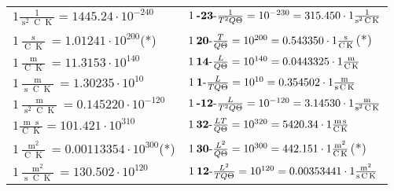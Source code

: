 \begin{center}
\begin{longtable}{l l}
{\color{black}$1 \bm{\mathrm{ }}\frac1{\operatorname{s}^2\operatorname{C}\operatorname{K}} = 1445.24\cdot10^{-240} $}&
	{\color{black}$1\:\text{\textbf{-23}-} \frac1{T^2Q\Theta}=10^{-230} = 315.450 \cdot 1 \bm{\mathrm{ }}\frac1{\operatorname{s}^2\operatorname{C}\operatorname{K}}$}\\
{\color{black}$1 \bm{\mathrm{ }}\frac{\operatorname{s}}{\operatorname{C}\operatorname{K}} = 1.01241\cdot10^{200} $}\quad(*)&
	{\color{black}$1\:\text{\textbf{20}-} \frac{T}{Q\Theta}=10^{200} = 0.543350 \cdot 1 \bm{\mathrm{ }}\frac{\operatorname{s}}{\operatorname{C}\operatorname{K}}$}\quad(*)\\
{\color{black}$1 \bm{\mathrm{ }}\frac{\operatorname{m}}{\operatorname{C}\operatorname{K}} = 11.3153\cdot10^{140} $}&
	{\color{black}$1\:\text{\textbf{14}-} \frac{L}{Q\Theta}=10^{140} = 0.0443325 \cdot 1 \bm{\mathrm{ }}\frac{\operatorname{m}}{\operatorname{C}\operatorname{K}}$}\\
{\color{black}$1 \bm{\mathrm{ }}\frac{\operatorname{m}}{\operatorname{s}\operatorname{C}\operatorname{K}} = 1.30235\cdot10^{10} $}&
	{\color{black}$1\:\text{\textbf{1}-} \frac{L}{TQ\Theta}=10^{10} = 0.354502 \cdot 1 \bm{\mathrm{ }}\frac{\operatorname{m}}{\operatorname{s}\operatorname{C}\operatorname{K}}$}\\
{\color{black}$1 \bm{\mathrm{ }}\frac{\operatorname{m}}{\operatorname{s}^2\operatorname{C}\operatorname{K}} = 0.145220\cdot10^{-120} $}&
	{\color{black}$1\:\text{\textbf{-12}-} \frac{L}{T^2Q\Theta}=10^{-120} = 3.14530 \cdot 1 \bm{\mathrm{ }}\frac{\operatorname{m}}{\operatorname{s}^2\operatorname{C}\operatorname{K}}$}\\
{\color{black}$1 \bm{\mathrm{ }}\frac{\operatorname{m}\operatorname{s}}{\operatorname{C}\operatorname{K}} = 101.421\cdot10^{310} $}&
	{\color{black}$1\:\text{\textbf{32}-} \frac{LT}{Q\Theta}=10^{320} = 5420.34 \cdot 1 \bm{\mathrm{ }}\frac{\operatorname{m}\operatorname{s}}{\operatorname{C}\operatorname{K}}$}\\
{\color{black}$1 \bm{\mathrm{ }}\frac{\operatorname{m}^2}{\operatorname{C}\operatorname{K}} = 0.00113354\cdot10^{300} $}\quad(*)&
	{\color{black}$1\:\text{\textbf{30}-} \frac{L^2}{Q\Theta}=10^{300} = 442.151 \cdot 1 \bm{\mathrm{ }}\frac{\operatorname{m}^2}{\operatorname{C}\operatorname{K}}$}\quad(*)\\
{\color{black}$1 \bm{\mathrm{ }}\frac{\operatorname{m}^2}{\operatorname{s}\operatorname{C}\operatorname{K}} = 130.502\cdot10^{120} $}&
	{\color{black}$1\:\text{\textbf{12}-} \frac{L^2}{TQ\Theta}=10^{120} = 0.00353441 \cdot 1 \bm{\mathrm{ }}\frac{\operatorname{m}^2}{\operatorname{s}\operatorname{C}\operatorname{K}}$}\\

\end{longtable}
\end{center}

